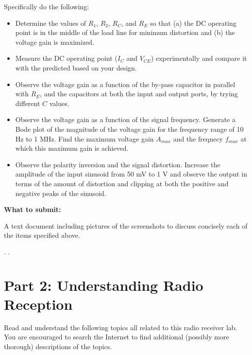 Specifically do the following:
\begin{itemize}
\item Determine the values of $R_1$, $R_2$, $R_C$, and $R_E$ so that (a) the 
  DC operating point is in the middle of the load line for minimum distortion
  and (b) the voltage gain is maximized. 

\item Measure the DC operating point ($I_{C}$ and $V_{CE}$) experimentally and
  compare it with the predicted based on your design.

\item Observe the voltage gain as a function of the by-pass capacitor in 
  parallel with $R_E$, and the capacitors at both the input and output ports,
  by trying different $C$ values. 

\item Observe the voltage gain as a function of the signal frequency.
  Generate a Bode plot of the magnitude of the voltage gain for the 
  frequency range of 10 Hz to 1 MHz. Find the maximum voltage gain $A_{max}$
  and the freqnecy $f_{max}$ at which this maximum gain is achieved.

\item Observe the polarity inversion and the signal distortion. Increase
  the amplitude of the input sinusoid from 50 mV to 1 V and observe the 
  output in terms of the amount of distortion and clipping at both the 
  positive and negative peaks of the sinusoid.

\end{itemize}

{\bf What to submit:}

A text document including pictures of the screenshots to discuss concisely
each of the items specified above.

.
.


\section{Part 2: Understanding Radio Reception}

Read and understand the following topics all related to this radio receiver lab. You 
are encouraged to search the Internet to find additional (possibly more thorough) 
descriptions of the topics.


